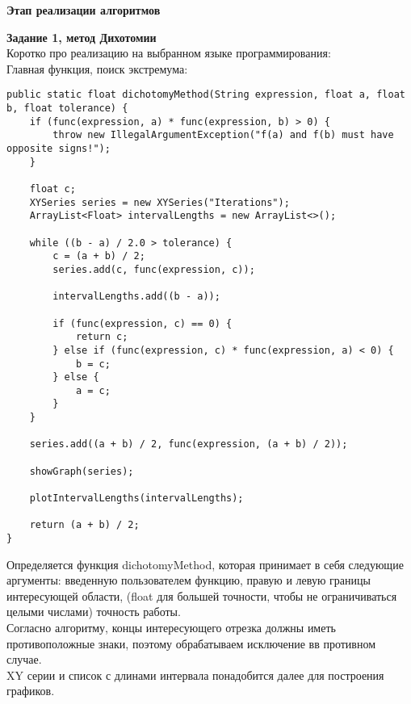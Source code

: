 \textbf{Этап реализации алгоритмов}
\vspace{1cm}

\textbf{Задание 1, метод Дихотомии}\\

Коротко про реализацию на выбранном языке программирования:
\\

Главная функция, поиск экстремума:

\begin{lstlisting}[style=JavaStyle, caption={Java Code for Dichotomy Method}]
public static float dichotomyMethod(String expression, float a, float b, float tolerance) {
    if (func(expression, a) * func(expression, b) > 0) {
        throw new IllegalArgumentException("f(a) and f(b) must have opposite signs!");
    }

    float c;
    XYSeries series = new XYSeries("Iterations");
    ArrayList<Float> intervalLengths = new ArrayList<>();

    while ((b - a) / 2.0 > tolerance) {
        c = (a + b) / 2;
        series.add(c, func(expression, c));

        intervalLengths.add((b - a));

        if (func(expression, c) == 0) {
            return c;
        } else if (func(expression, c) * func(expression, a) < 0) {
            b = c;
        } else {
            a = c;
        }
    }

    series.add((a + b) / 2, func(expression, (a + b) / 2));

    showGraph(series);

    plotIntervalLengths(intervalLengths);

    return (a + b) / 2;
}
    \end{lstlisting}

Определяется функция dichotomyMethod, которая принимает в себя следующие аргументы:
введенную пользователем функцию, правую и левую границы интересующей области, (float для
большей точности, чтобы не ограничиваться целыми числами) точность работы.\\

Согласно алгоритму, концы интересующего отрезка должны иметь противоположные знаки,
поэтому обрабатываем исключение вв противном случае.\\

XY серии и список с длинами интервала понадобится далее для построения графиков.\\

